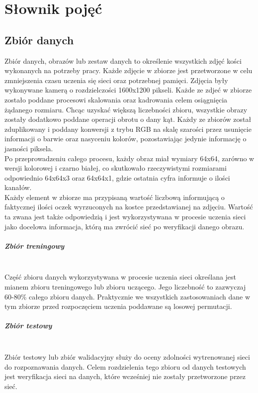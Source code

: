 
\chapter{Słownik pojęć}
\section{Zbiór danych}
Zbiór danych, obrazów lub zestaw danych to określenie wszystkich zdjęć kości wykonanych na
potrzeby pracy. Każde zdjęcie w zbiorze jest przetworzone w celu zmniejszenia czasu uczenia
się sieci oraz potrzebnej pamięci. Zdjęcia były wykonywane kamerą o rozdzielczości 1600x1200
pikseli. Każde ze zdjeć w zbiorze zostało poddane procesowi skalowania oraz kadrowania celem
osiągnięcia żądanego rozmiaru. Chcąc uzyskać większą liczebności zbioru, wszystkie obrazy
zostały dodatkowo poddane operacji obrotu o dany kąt. Każdy ze zbiorów został zduplikowany
i poddany konwersji z trybu RGB na skalę szarości przez usunięcie informacji o barwie
oraz nasyceniu kolorów, pozostawiając jedynie informację o jasności piksela.\\
Po przeprowadzeniu całego procesu, każdy obraz miał wymiary 64x64, zarówno w wersji
kolorowej i czarno białej, co skutkowało rzeczywistymi rozmiarami odpowiednio 64x64x3
oraz 64x64x1, gdzie ostatnia cyfra informuje o ilości kanałów.\\
Każdy element w zbiorze ma przypisaną wartość liczbową informującą o faktycznej ilości
oczek wyrzuconych na kostce przedstawianej na zdjęciu. Wartość ta zwana jest także
odpowiedzią i jest wykorzystywana w procesie uczenia sieci jako docelowa informacja,
którą ma zwrócić sieć po weryfikacji danego obrazu.

\paragraph{Zbiór treningowy} \mbox{}\\
Część zbioru danych wykorzystywana w procesie uczenia sieci określana jest mianem zbioru
treningowego lub zbioru uczącego. Jego liczebność to zazwyczaj 60-80\% całego zbioru danych.
Praktycznie we wszystkich zastosowaniach dane w tym zbiorze przed rozpoczęciem uczenia
poddawane są losowej permutacji.

\paragraph{Zbiór testowy} \mbox{}\\
Zbiór testowy lub zbiór walidacyjny służy do oceny zdolności wytrenowanej sieci do
rozpoznawania danych. Celem rozdzielenia tego zbioru od danych testowych jest weryfikacja
sieci na danych, które wcześniej nie zostały przetworzone przez sieć.

